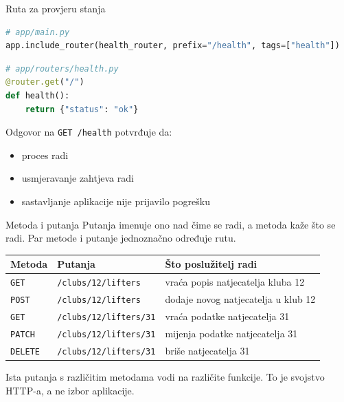 \begin{frame}[fragile]{Ruta za provjeru stanja}
\begin{lstlisting}[language=python]
# app/main.py
app.include_router(health_router, prefix="/health", tags=["health"])
\end{lstlisting}

\begin{lstlisting}[language=python]
# app/routers/health.py
@router.get("/")
def health():
    return {"status": "ok"}
\end{lstlisting}

\vspace{0.4em}
Odgovor na \texttt{GET /health} potvrđuje da:

\begin{itemize}
  \item proces radi
  \item usmjeravanje zahtjeva radi
  \item sastavljanje aplikacije nije prijavilo pogrešku
\end{itemize}
\end{frame}




\begin{frame}{Metoda i putanja}
Putanja imenuje ono nad čime se radi, a metoda kaže što se radi. Par metode i putanje jednoznačno određuje rutu.

\vspace{0.5em}
{\small
\setlength{\tabcolsep}{4pt}
\begin{tabular}{@{}llL{5.6cm}@{}}
  \toprule
  \textbf{Metoda} & \textbf{Putanja} & \textbf{Što poslužitelj radi} \\
  \midrule
  \texttt{GET}    & \texttt{/clubs/12/lifters}    & vraća popis natjecatelja kluba 12 \\
  \texttt{POST}   & \texttt{/clubs/12/lifters}    & dodaje novog natjecatelja u klub 12 \\
  \texttt{GET}    & \texttt{/clubs/12/lifters/31} & vraća podatke natjecatelja 31 \\
  \texttt{PATCH}  & \texttt{/clubs/12/lifters/31} & mijenja podatke natjecatelja 31 \\
  \texttt{DELETE} & \texttt{/clubs/12/lifters/31} & briše natjecatelja 31 \\
  \bottomrule
\end{tabular}
}

\vspace{0.5em}
Ista putanja s različitim metodama vodi na različite funkcije. To je svojstvo HTTP-a, a ne izbor aplikacije.
\end{frame}

